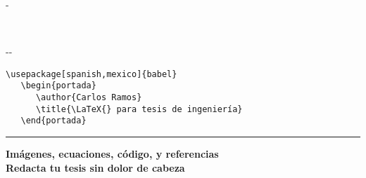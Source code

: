 %
%
%
%
%
{
\selectfont
\begin{titlepage} %
\vspace*{-0.625in} %
\begin{adjustwidth}{-\margenAdicional}{}
\pagecolor{FondoPortada}
\color{TextoPortada}

\vspace*{25mm} %


\begin{center}
\scalebox{9}{\LaTeX{}}\\
\vspace{6pt}
\scalebox{2.25}{para tesis de ingeniería}
\end{center}

\vspace*{30mm}

\begin{adjustwidth}{-\margenIzquierdo}{-\margenDerecho}
\begin{mdframed}[
	backgroundcolor=FondoCodigoPortada,
	innertopmargin=1.25mm,
	innerbottommargin=1.25mm,
	innerrightmargin=0pt,
	innerleftmargin=0pt
]
\begin{lstlisting}[style=portada]
   \usepackage[spanish,mexico]{babel}
   \begin{portada}
      \author{Carlos Ramos}
      \title{\LaTeX{} para tesis de ingeniería}
   \end{portada}
\end{lstlisting}
\end{mdframed}
\end{adjustwidth}

\centering
\vspace*{2\baselineskip}

\noindent\rule{0.25\linewidth}{2pt}

\vspace*{2\baselineskip}

\noindent\textbf{\LARGE
	Imágenes, ecuaciones, código, y referencias
	\\[4pt]
	Redacta tu tesis sin dolor de cabeza
}

\end{adjustwidth}
\end{titlepage}
}

\pagecolor{White}